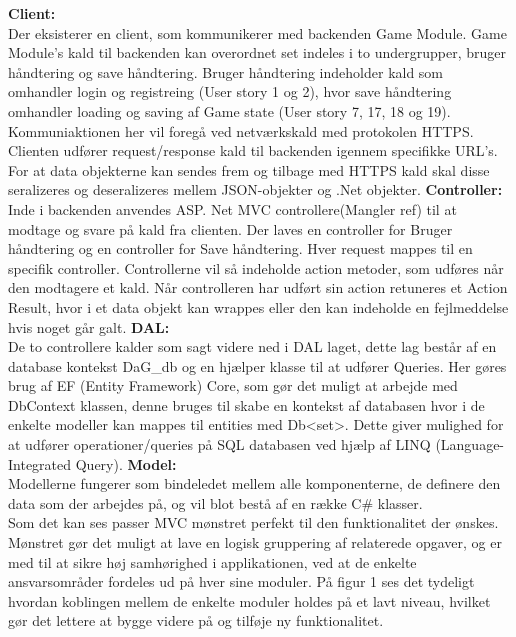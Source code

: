 \textbf{Client:}\\
Der eksisterer en client, som kommunikerer med backenden Game Module. Game Module’s kald til backenden kan overordnet set indeles i to undergrupper, bruger håndtering og save håndtering. Bruger håndtering indeholder kald som omhandler login og registreing  (User story 1 og 2), hvor save håndtering omhandler loading og saving af Game state (User story 7, 17, 18 og 19). Kommuniaktionen her vil foregå ved netværkskald med protokolen HTTPS. Clienten udfører request/response kald til backenden igennem specifikke URL’s. For at data objekterne kan sendes frem og tilbage med HTTPS kald skal disse seralizeres og deseralizeres mellem JSON-objekter og .Net objekter.
\textbf{Controller:}\\
Inde i backenden anvendes ASP. Net MVC controllere(Mangler ref)   til at modtage og svare på kald fra clienten. Der laves en controller for Bruger håndtering og en controller for Save håndtering. Hver request mappes til en specifik controller. Controllerne vil så indeholde action metoder, som udføres når den modtagere et kald. Når controlleren har udført sin action retuneres et Action Result, hvor i et data objekt kan wrappes eller den kan indeholde en fejlmeddelse hvis noget går galt.
\textbf{DAL:}\\
De to controllere kalder som sagt videre ned i DAL laget, dette lag består af en database kontekst DaG\_db og en hjælper klasse til at udfører Queries. Her gøres brug af EF (Entity Framework) Core, som gør det muligt at arbejde med DbContext klassen, denne bruges til skabe en kontekst af databasen hvor i de enkelte modeller kan mappes til entities med Db<set>. Dette giver mulighed for at udfører operationer/queries på SQL databasen ved hjælp af LINQ (Language-Integrated Query).
\textbf{Model:}\\
Modellerne fungerer som bindeledet mellem alle komponenterne, de definere den data som der arbejdes på, og vil blot bestå af en række C\# klasser.\\

Som det kan ses passer MVC mønstret perfekt til den funktionalitet der ønskes. Mønstret gør det muligt at lave en logisk gruppering af relaterede opgaver, og er med til at sikre høj samhørighed i applikationen, ved at de enkelte ansvarsområder fordeles ud på hver sine moduler. På figur 1 ses det tydeligt hvordan koblingen mellem de enkelte moduler holdes på et lavt niveau, hvilket gør det lettere at bygge videre på og tilføje ny funktionalitet.


